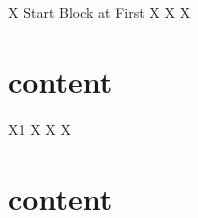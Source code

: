 \documentclass{article}
\begin{document}
X Start Block at First
X
X
X
\part*[options]{content}
    X1
    X
    X
    X
\part[options]{content}
\end{document}
